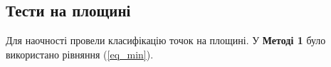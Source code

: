 \documentclass[a4paper,12pt]{article}
\begin{document}
\subsection{Тести на площині}

Для наочності провели класифікацію точок на площині. У \textbf{Методі 1} було використано рівняння (\ref{eq_min}).


\begin{figure}[h]
	\begin{minipage}[h]{0.5\linewidth}
		 \\
	\end{minipage}
	\hfill
	\begin{minipage}[h]{0.47\linewidth}
		 \\

\end{minipage}
\end{figure}
\end{document}

